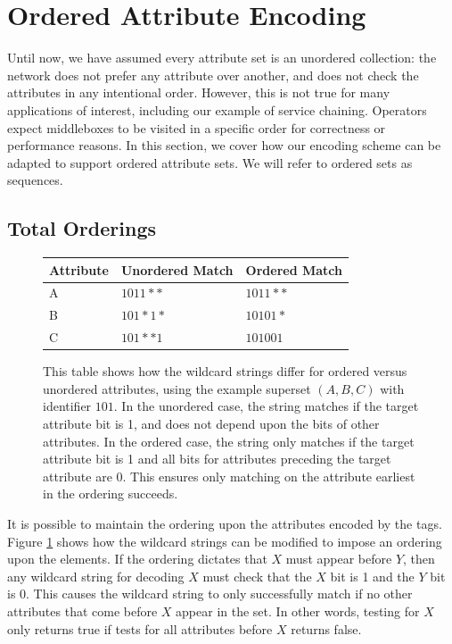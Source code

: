 \section{Ordered Attribute Encoding}
Until now, we have assumed every attribute set is an unordered collection: the network does not prefer any attribute over another, and does not check the attributes in any intentional order. However, this is not true for many applications of interest, including our example of service chaining. Operators expect middleboxes to be visited in a specific order for correctness or performance reasons. In this section, we cover how our encoding scheme can be adapted to support ordered attribute sets. We will refer to ordered sets as sequences.


\subsection{Total Orderings}
\begin{figure}
    \begin{tabular}{| l | l | l |}
    \hline
    Attribute & Unordered Match & Ordered Match\\ \hline
    A & $1011**$ & $1011**$ \\ \hline
    B & $101*1*$ & $10101*$ \\ \hline
    C & $101**1$ & $101001$ \\
    \hline
    \end{tabular}
    \caption{This table shows how the wildcard strings differ for ordered versus unordered attributes, using the example superset $(A,B,C)$ with identifier $101$. In the unordered case, the string matches if the target attribute bit is 1, and does not depend upon the bits of other attributes. In the ordered case, the string only matches if the target attribute bit is 1 and all bits for attributes preceding the target attribute are 0. This ensures only matching on the attribute earliest in the ordering succeeds.} 
    \label{tab:ordering}
\end{figure}


It is possible to maintain the ordering upon the attributes encoded by the tags. Figure \ref{tab:ordering} shows how the wildcard strings can be modified to impose an ordering upon the elements. If the ordering dictates that $X$ must appear before $Y$, then any wildcard string for decoding $X$ must check that the $X$ bit is 1 and the $Y$ bit is 0. This causes the wildcard string to only successfully match if no other attributes that come before $X$ appear in the set. In other words, testing for $X$ only returns true if tests for all attributes before $X$ returns false. 


